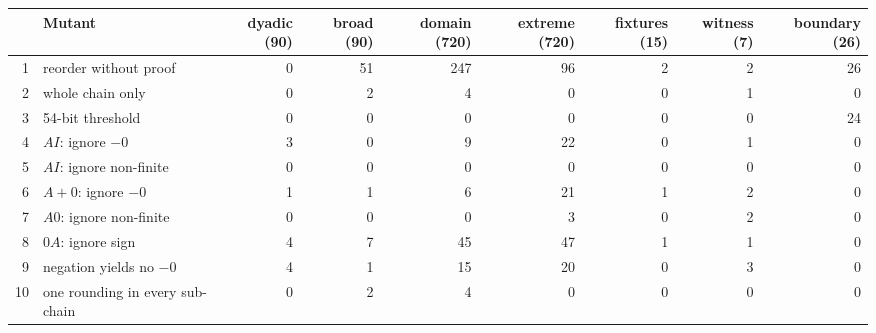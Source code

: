 \begin{tabular}{rlrrrrrrr}
\toprule
 & Mutant & dyadic (90) & broad (90) & domain (720) & extreme (720) & fixtures (15) & witness (7) & boundary (26)\\
\midrule
1 & reorder without proof & 0 & 51 & 247 & 96 & 2 & 2 & 26\\
2 & whole chain only & 0 & 2 & 4 & 0 & 0 & 1 & 0\\
3 & 54-bit threshold & 0 & 0 & 0 & 0 & 0 & 0 & 24\\
4 & $A I$: ignore $-0$ & 3 & 0 & 9 & 22 & 0 & 1 & 0\\
5 & $A I$: ignore non-finite & 0 & 0 & 0 & 0 & 0 & 0 & 0\\
6 & $A+0$: ignore $-0$ & 1 & 1 & 6 & 21 & 1 & 2 & 0\\
7 & $A 0$: ignore non-finite & 0 & 0 & 0 & 3 & 0 & 2 & 0\\
8 & $0 A$: ignore sign & 4 & 7 & 45 & 47 & 1 & 1 & 0\\
9 & negation yields no $-0$ & 4 & 1 & 15 & 20 & 0 & 3 & 0\\
10 & one rounding in every sub-chain & 0 & 2 & 4 & 0 & 0 & 0 & 0\\
\bottomrule
\end{tabular}

